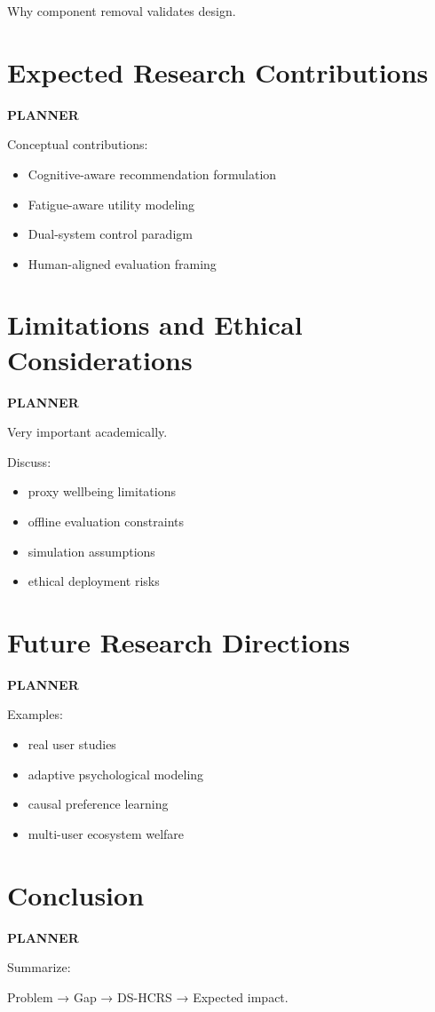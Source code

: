 \documentclass[lettersize,journal]{IEEEtran}
\begin{document}
Why component removal validates design.

% 

\section{Expected Research Contributions}

\textbf{PLANNER}

Conceptual contributions:

\begin{itemize}
    \item Cognitive-aware recommendation formulation
    \item Fatigue-aware utility modeling
    \item Dual-system control paradigm
    \item Human-aligned evaluation framing
\end{itemize}

% 

\section{Limitations and Ethical Considerations}

\textbf{PLANNER}

Very important academically.

Discuss:

\begin{itemize}
    \item proxy wellbeing limitations
    \item offline evaluation constraints
    \item simulation assumptions
    \item ethical deployment risks
\end{itemize}

% 

\section{Future Research Directions}

\textbf{PLANNER}

Examples:

\begin{itemize}
    \item real user studies
    \item adaptive psychological modeling
    \item causal preference learning
    \item multi-user ecosystem welfare
\end{itemize}

% 

\section{Conclusion}

\textbf{PLANNER}

Summarize:

Problem → Gap → DS-HCRS → Expected impact.




\vfill
\end{document}
